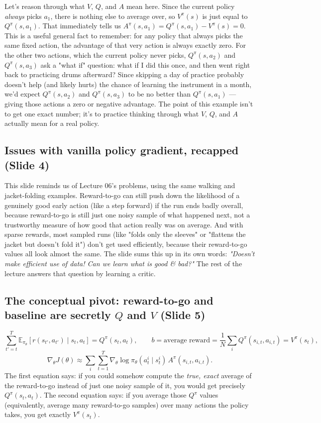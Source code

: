 \documentclass[11pt]{article}
\begin{document}
Let's reason through what $V$, $Q$, and $A$ mean here. Since the current policy \emph{always} picks $a_1$, there is nothing else to average over, so $V^\pi(s)$ is just equal to $Q^\pi(s,a_1)$. That immediately tells us $A^\pi(s,a_1) = Q^\pi(s,a_1) - V^\pi(s) = 0$. This is a useful general fact to remember: for any policy that always picks the same fixed action, the advantage of that very action is always exactly zero. For the other two actions, which the current policy never picks, $Q^\pi(s,a_2)$ and $Q^\pi(s,a_3)$ ask a "what if" question: what if I did this once, and then went right back to practicing drums afterward? Since skipping a day of practice probably doesn't help (and likely hurts) the chance of learning the instrument in a month, we'd expect $Q^\pi(s,a_2)$ and $Q^\pi(s,a_3)$ to be no better than $Q^\pi(s,a_1)$ --- giving those actions a zero or negative advantage. The point of this example isn't to get one exact number; it's to practice thinking through what $V$, $Q$, and $A$ actually mean for a real policy.

\subsection{Issues with vanilla policy gradient, recapped (Slide 4)}
This slide reminds us of Lecture 06's problems, using the same walking and jacket-folding examples. Reward-to-go can still push down the likelihood of a genuinely good early action (like a step forward) if the run ends badly overall, because reward-to-go is still just one noisy sample of what happened next, not a trustworthy measure of how good that action really was on average. And with sparse rewards, most sampled runs (like "folds only the sleeves" or "flattens the jacket but doesn't fold it") don't get used efficiently, because their reward-to-go values all look almost the same. The slide sums this up in its own words: \emph{"Doesn't make efficient use of data! Can we learn what is good \& bad?"} The rest of the lecture answers that question by learning a critic.

\subsection{The conceptual pivot: reward-to-go and baseline are secretly $Q$ and $V$ (Slide 5)}
$$\sum_{t'=t}^{T}\mathbb{E}_{\pi_\theta}[r(s_{t'},a_{t'})\mid s_t,a_t] = Q^\pi(s_t,a_t), \qquad b = \text{average reward} = \frac{1}{N}\sum_i Q^\pi(s_{i,t},a_{i,t}) = V^\pi(s_t),$$
$$\nabla_\theta J(\theta) \approx \sum_i\sum_{t=1}^{T} \nabla_\theta\log\pi_\theta(a^i_t\mid s^i_t)\,A^\pi(s_{i,t},a_{i,t}).$$
The first equation says: if you could somehow compute the \emph{true, exact} average of the reward-to-go instead of just one noisy sample of it, you would get precisely $Q^\pi(s_t,a_t)$. The second equation says: if you average those $Q^\pi$ values (equivalently, average many reward-to-go samples) over many actions the policy takes, you get exactly $V^\pi(s_t)$.
\end{document}
